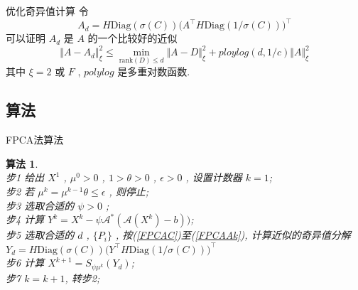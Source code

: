 \documentclass[slidestop,compress,mathserif,UTF8]{beamer}
\newtheorem{algo}{\bf \textcolor[rgb]{0.8,0,0}{算法}}
\numberwithin{equation}{section}                                %
\begin{document}
            \begin{frame}[t]{优化奇异值计算}
                令
                \begin{equation}\label{FPCAAk}
                        A_d
                    =	H \text{Diag}(\sigma(C)) \big(A ^\top H \text{Diag}(1/\sigma(C))\big)^\top
                \end{equation}
                可以证明 $A_d$ 是 $A$ 的一个比较好的近似
                \begin{equation}
                        \Vert{A - A_d}\Vert^2_\xi 
                    \le	\min_{\text{rank}(D) \le d} \Vert{A - D}\Vert^2_\xi + ploylog(d, 1/c) \Vert{A}\Vert^2_\xi
                \end{equation}
                其中 $\xi = 2 \text{ 或 } F$ , $polylog$ 是多重对数函数.
            \end{frame}
        \subsection{算法}
            \begin{frame}[t]{FPCA法算法}
                \begin{algo}
                    \quad\\
                    步1 \quad 给出 $X^1$ , $\mu^0 > 0$ , $1 > \theta > 0$ , $\epsilon > 0$ , 设置计数器 $k = 1$;\\
                    步2 \quad 若 $\mu^k = \mu^{k -1} \theta \le \epsilon$ , 则停止;\\
                    步3 \quad 选取合适的 $\psi > 0$ ;\\
                    步4 \quad 计算 $Y^k = X^k - \psi \mathcal{A}^*(\mathcal{A}(X^k) - b))$;\\
                    步5 \quad 选取合适的 $d$ , $\{P_i\}$ , 按(\ref{FPCAC})至(\ref{FPCAAk}), 计算近似的奇异值分解 $Y_d = H \text{Diag}(\sigma(C)) \big(Y ^\top H \text{Diag}(1/\sigma(C))\big)^\top$\\
                    步6 \quad 计算 $X^{k + 1} = S_{\psi \mu^k}(Y_d)$;\\
                    步7 \quad $k = k + 1$, 转步2;
                \end{algo}
            \end{frame}
\end{document}
